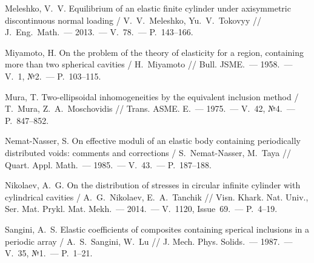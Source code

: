 \begin{biblist}{99}
Meleshko, V.~V. 
Equilibrium of an elastic finite cylinder under axisymmetric discontinuous normal loading 
/ V.~V.~Meleshko, Yu.~V.~Tokovyy 
// J.~Eng.~Math.~--- 2013.~--- V.~78.~--- P.~143--166.  

Miyamoto, H. 
On the problem of the theory of elasticity for a region, containing more than two spherical cavities 
/ H.~Miyamoto 
// Bull. JSME.~--- 1958.~--- V.~1, №2.~--- P.~103--115.

Mura, T. 
Two-ellipsoidal inhomogeneities by the equivalent inclusion method 
/ T.~Mura, Z.~A.~Moschovidis 
// Trans. ASME. E.~--- 1975.~--- V.~42, №4.~--- P.~847--852.

Nemat-Nasser, S. 
On effective moduli of an elastic body containing periodically distributed voids: comments and corrections  
/ S.~Nemat-Nasser, M.~Taya 
// Quart. Appl. Math.~--- 1985.~--- V.~43.~--- P.~187--188.

Nikolaev, A.~G. 
On the distribution of stresses in circular infinite cylinder with cylindrical cavities 
/ A.~G.~Nikolaev, E.~A.~Tanchik 
// Visn. Khark. Nat. Univ., Ser. Mat. Prykl. Mat. Mekh.~--- 2014.~--- V.~1120, Issue~69.~--- P.~4--19.





Sangini, A.~S. 
Elastic coefficients of composites containing sperical inclusions in a periodic array  
/ A.~S.~Sangini, W.~Lu 
// J. Mech. Phys. Solids.~--- 1987.~--- V.~35, №1.~--- P.~1--21.


\end{biblist}
